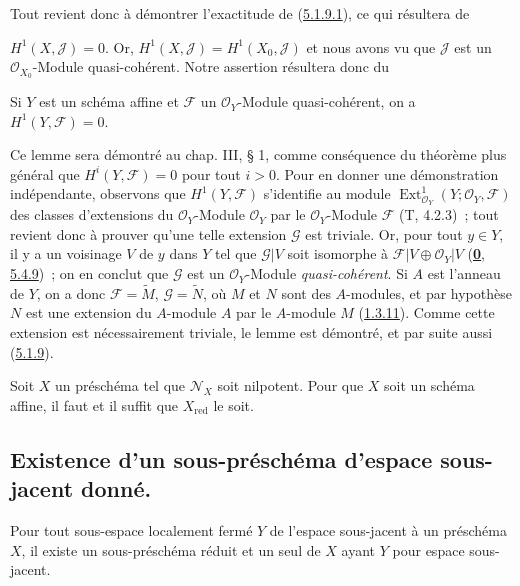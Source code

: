 Tout revient donc à démontrer l'exactitude de
(\hyperref[I.5.1.9.1-fr]{5.1.9.1}), ce qui résultera de

$H^1(X,\mathscr{J})=0$. Or,
$H^1(X,\mathscr{J})=H^1(X_0,\mathscr{J})$ et nous avons vu que
$\mathscr{J}$ est un $\mathscr{O}_{X_0}$-Module quasi-cohérent. Notre
assertion résultera donc du

\begin{lemma}[5.1.9.2]
\label{I.5.1.9.2-fr}
Si $Y$ est un schéma affine et $\mathscr{F}$ un $\mathscr{O}_Y$-Module
quasi-cohérent, on a $H^1(Y,\mathscr{F})=0$.
\end{lemma}

Ce lemme sera démontré au chap. III, § 1, comme conséquence du théorème plus
général que $H^i(Y,\mathscr{F})=0$ pour tout $i>0$. Pour en donner une
démonstration indépendante, observons que $H^1(Y,\mathscr{F})$ s'identifie au
module $\operatorname{Ext}^1_{\mathscr{O}_Y}
(Y;\mathscr{O}_Y,\mathscr{F})$ des classes d'extensions du
$\mathscr{O}_Y$-Module $\mathscr{O}_Y$ par le $\mathscr{O}_Y$-Module
$\mathscr{F}$ (T, 4.2.3)~; tout revient donc à prouver qu'une telle extension
$\mathscr{G}$ est triviale. Or, pour tout $y\in Y$, il y a un voisinage $V$
de $y$ dans $Y$ tel que $\mathscr{G}|V$ soit isomorphe à
$\mathscr{F}|V\oplus\mathscr{O}_Y|V$
(\hyperref[0.5.4.9-fr]{\textbf{0}, 5.4.9})~; on en conclut que $\mathscr{G}$ est un
$\mathscr{O}_Y$-Module \emph{quasi-cohérent}. Si $A$ est l'anneau de $Y$, on a donc
$\mathscr{F}=\widetilde{M}$, $\mathscr{G}=\widetilde{N}$, où $M$ et $N$ sont
des $A$-modules, et par hypothèse $N$ est une extension du $A$-module $A$ par
le $A$-module $M$ (\hyperref[I.1.3.11-fr]{1.3.11}). Comme cette extension est
nécessairement triviale, le lemme est démontré, et par suite aussi
(\hyperref[I.5.1.9-fr]{5.1.9}).

\begin{corollary}[5.1.10]
\label{I.5.1.10-fr}
Soit $X$ un préschéma tel que $\mathscr{N}_X$ soit nilpotent. Pour que $X$
soit un schéma affine, il faut et il suffit que $X_{\mathrm{red}}$ le soit.
\end{corollary}

\subsection{Existence d'un sous-préschéma d'espace sous-jacent donné.}
\label{subsection:I.5.2-fr}

\begin{proposition}[5.2.1]
\label{I.5.2.1-fr}
Pour tout sous-espace localement fermé $Y$ de l'espace sous-jacent à un
préschéma $X$, il existe un sous-préschéma réduit et un seul de $X$ ayant $Y$
pour espace sous-jacent.
\end{proposition}

